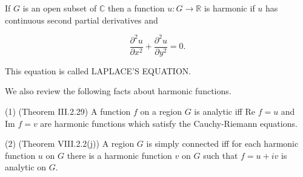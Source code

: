 If $G$ is an open subset of $\mathbb{C}$ then a function $u: G \to \mathbb{R}$ is harmonic if $u$ has continuous second partial derivatives and

$$\frac{\partial^2 u}{\partial x^2} + \frac{\partial^2 u}{\partial y^2} = 0.$$

This equation is called LAPLACE’S EQUATION.

We also review the following facts about harmonic functions.

(1) (Theorem III.2.29) A function $f$ on a region $G$ is analytic iff $\text{Re } f = u$ and $\text{Im } f = v$ are harmonic functions which satisfy the Cauchy-Riemann equations.

(2) (Theorem VIII.2.2(j)) A region $G$ is simply connected iff for each harmonic function $u$ on $G$ there is a harmonic function $v$ on $G$ such that $f = u + iv$ is analytic on $G$.